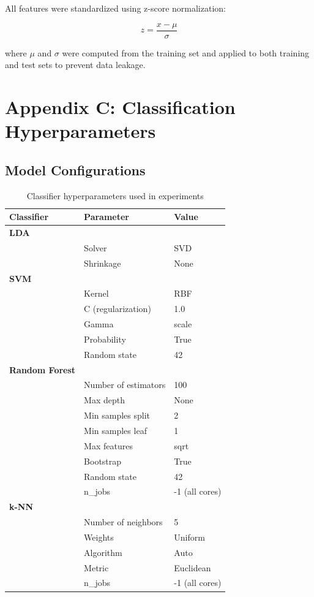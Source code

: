 \documentclass[11pt]{article}
\begin{document}
All features were standardized using z-score normalization:

\begin{equation}
z = \frac{x - \mu}{\sigma}
\end{equation}

where $\mu$ and $\sigma$ were computed from the training set and applied to both training and test sets to prevent data leakage.

\section{Appendix C: Classification Hyperparameters}

\subsection{Model Configurations}

\begin{table}[H]
\centering
\caption{Classifier hyperparameters used in experiments}
\begin{tabular}{@{}lll@{}}
\toprule
\textbf{Classifier} & \textbf{Parameter} & \textbf{Value} \\
\midrule
\textbf{LDA} & & \\
& Solver & SVD \\
& Shrinkage & None \\
\midrule
\textbf{SVM} & & \\
& Kernel & RBF \\
& C (regularization) & 1.0 \\
& Gamma & scale \\
& Probability & True \\
& Random state & 42 \\
\midrule
\textbf{Random Forest} & & \\
& Number of estimators & 100 \\
& Max depth & None \\
& Min samples split & 2 \\
& Min samples leaf & 1 \\
& Max features & sqrt \\
& Bootstrap & True \\
& Random state & 42 \\
& n\_jobs & -1 (all cores) \\
\midrule
\textbf{k-NN} & & \\
& Number of neighbors & 5 \\
& Weights & Uniform \\
& Algorithm & Auto \\
& Metric & Euclidean \\
& n\_jobs & -1 (all cores) \\
\bottomrule
\end{tabular}
\end{table}
\end{document}
